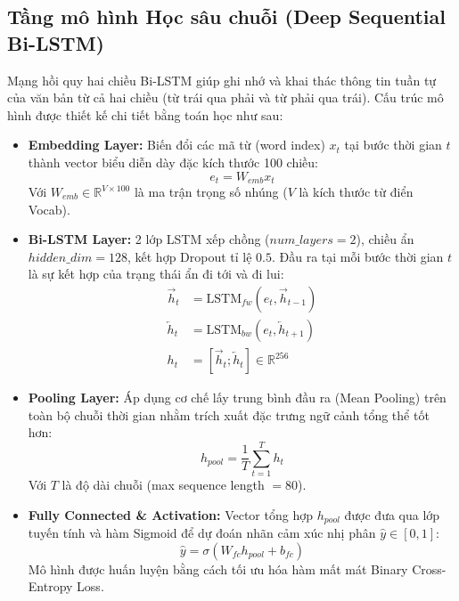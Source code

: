 \documentclass[12pt,a4paper]{article}
\begin{document}
\subsection{Tầng mô hình Học sâu chuỗi (Deep Sequential Bi-LSTM)}
Mạng hồi quy hai chiều Bi-LSTM giúp ghi nhớ và khai thác thông tin tuần tự của văn bản từ cả hai chiều (từ trái qua phải và từ phải qua trái). Cấu trúc mô hình được thiết kế chi tiết bằng toán học như sau:
\begin{itemize}
    \item \textbf{Embedding Layer:} Biến đổi các mã từ (word index) $x_t$ tại bước thời gian $t$ thành vector biểu diễn dày đặc kích thước 100 chiều:
    \begin{equation}
        e_t = W_{emb} x_t
    \end{equation}
    Với $W_{emb} \in \mathbb{R}^{V \times 100}$ là ma trận trọng số nhúng ($V$ là kích thước từ điển Vocab).
    
    \item \textbf{Bi-LSTM Layer:} 2 lớp LSTM xếp chồng ($num\_layers=2$), chiều ẩn $hidden\_dim=128$, kết hợp Dropout tỉ lệ $0.5$. Đầu ra tại mỗi bước thời gian $t$ là sự kết hợp của trạng thái ẩn đi tới và đi lui:
    \begin{align}
        \overrightarrow{h}_t &= \text{LSTM}_{fw}(e_t, \overrightarrow{h}_{t-1}) \\
        \overleftarrow{h}_t &= \text{LSTM}_{bw}(e_t, \overleftarrow{h}_{t+1}) \\
        h_t &= [\overrightarrow{h}_t ; \overleftarrow{h}_t] \in \mathbb{R}^{256}
    \end{align}
    
    \item \textbf{Pooling Layer:} Áp dụng cơ chế lấy trung bình đầu ra (Mean Pooling) trên toàn bộ chuỗi thời gian nhằm trích xuất đặc trưng ngữ cảnh tổng thể tốt hơn:
    \begin{equation}
        h_{pool} = \frac{1}{T} \sum_{t=1}^{T} h_t
    \end{equation}
    Với $T$ là độ dài chuỗi (max sequence length $= 80$).
    
    \item \textbf{Fully Connected \& Activation:} Vector tổng hợp $h_{pool}$ được đưa qua lớp tuyến tính và hàm Sigmoid để dự đoán nhãn cảm xúc nhị phân $\hat{y} \in [0, 1]$:
    \begin{equation}
        \hat{y} = \sigma(W_{fc} h_{pool} + b_{fc})
    \end{equation}
    Mô hình được huấn luyện bằng cách tối ưu hóa hàm mất mát Binary Cross-Entropy Loss.
\end{itemize}
\end{document}
